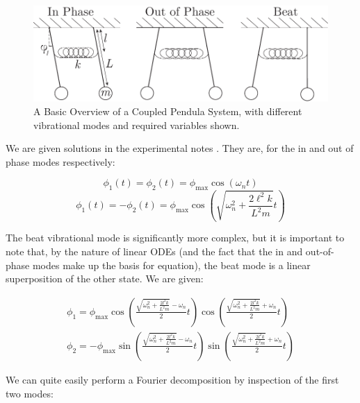 \documentclass[aps,prl,reprint,10pt,amsmath,amssymb,superscriptaddress,a4paper, floatfix]{revtex4-2}
\begin{document}
\begin{widetext}
\begin{figure}[t]
\includegraphics[width = 16 cm]{Modes and Variables Diagram.pdf}
\caption{A Basic Overview of a Coupled Pendula System, with different vibrational modes and required variables shown.}
\label{fig:modesandvariables}
\end{figure}

We are given solutions in the experimental notes \cite{notes}. They are, for the in and out of phase modes respectively:

\begin{equation}
\phi_1 \left( t \right) = \phi_2 \left( t \right) = \phi_\text{max} \cos \left( \omega_n t \right)
\end{equation} \begin{equation}
\phi_1 \left( t \right) = - \phi_2 \left( t \right) = \phi_\text{max} \cos \left( \sqrt{\omega_n^2 + \frac{2 \ell^2 k}{L^2 m}} t \right)
\end{equation}

The beat vibrational mode is significantly more complex, but it is important to note that, by the nature of linear ODEs (and the fact that the in and out-of-phase modes make up the basis for equation), the beat mode is a linear superposition of the other state. We are given:

\begin{eqnarray}
\label{eqn2} \phi_1 = \phi_\text{max} \cos \left( \frac{\sqrt{\omega_{n}^{2}+\frac{2 l^{2} k}{L^{2} m}} - \omega_n}{2} t \right)\cos \left( \frac{\sqrt{\omega_{n}^{2}+\frac{2 l^{2} k}{L^{2} m}} + \omega_n}{2} t \right) \\
\label{eqn3} \phi_2 = - \phi_\text{max} \sin \left( \frac{\sqrt{\omega_{n}^{2}+\frac{2 l^{2} k}{L^{2} m}} - \omega_n}{2} t \right)\sin \left( \frac{\sqrt{\omega_{n}^{2}+\frac{2 l^{2} k}{L^{2} m}} + \omega_n}{2} t \right) 
\end{eqnarray}
\end{widetext}

We can quite easily perform a Fourier decomposition by inspection of the first two modes\cite{note1}:
\end{document}
